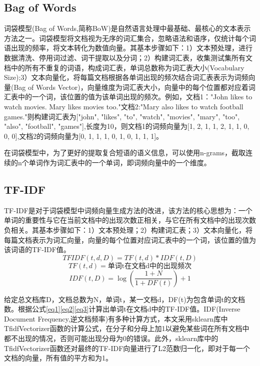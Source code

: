 \documentclass{article}
\begin{document}
\subsection{Bag of Words} \label{3.1}
词袋模型(Bag of Words,简称BoW)是自然语言处理中最基础、最核心的文本表示方法之一。词袋模型将文档视为无序的词汇集合，忽略语法和语序，仅统计每个词语出现的频率，将文本转化为数值向量。其基本步骤如下：1）文本预处理，进行数据清洗、停用词过滤、词干提取以及分词；2）构建词汇表，收集测试集所有文档中的所有不重复的词语，构成词汇表，单词总数称为词汇表大小(Vocabulary Size);3）文本向量化，将每篇文档根据各单词出现的频次结合词汇表表示为词频向量(Bag of Words Vector)，向量维度为词汇表大小，向量中的每个位置都对应着词汇表中的一个词，该位置的值为该单词出现的频次。例如，文档1："John likes to watch movies. Mary likes movies too."文档2:"Mary also likes to watch football games."则构建词汇表为["john", "likes", "to", "watch", "movies", "mary", "too", "also", "football", "games"],长度为10，则文档1的词频向量为[1, 2, 1, 1, 2, 1, 1, 0, 0, 0],文档2的词频向量为[0, 1, 1, 1, 0, 1, 0, 1, 1, 1]。

在词袋模型中，为了更好的提取复合短语的语义信息，可以使用n-grams，截取连续的n个单词作为词汇表中的一个单词，即词频向量中的一个维度。

\subsection{TF-IDF} \label{3.2}
TF-IDF是对于词袋模型中词频向量生成方法的改进，该方法的核心思想为：一个单词的重要性与它在当前文档中的出现次数正相关，与它在所有文档中的出现次数负相关。其基本步骤如下：1）文本预处理；2）构建词汇表；3）文本向量化，将每篇文档表示为词汇向量，向量的每个位置对应词汇表中的一个词，该位置的值为该词语的TF-IDF值。
\begin{equation}
    TFIDF(t,d,D)=TF(t,d)*IDF(t,D) \label{eq1}
\end{equation}
\begin{equation}
    TF(t,d)=\text{单词t在文档d中的出现频次} \label{eq2}
\end{equation}
\begin{equation}
    IDF(t,D)=\log(\frac{1+N}{1+DF(t)})+1 \label{eq3}
\end{equation}

给定总文档库D，文档总数为N，单词t，某一文档d，DF(t)为包含单词t的文档数。根据公式\eqref{eq1}\eqref{eq2}\eqref{eq3}计算出单词t在文档d中的TF-IDF值。IDF(Inverse Document Frequency,逆文档频率)有多种计算方式，本文采用sklearn库中TfidfVectorizer函数的计算公式，在分子和分母上加1以避免某些词在所有文档中都不出现的情况，否则可能出现分母为0的错误。此外，sklearn库中的TfidfVectorizer函数还对最终的TF-IDF向量进行了L2范数归一化，即对于每一个文档的向量，所有值的平方和为1。
\end{document}
